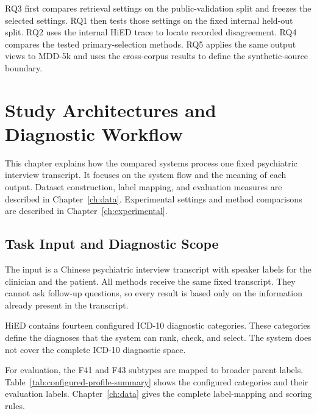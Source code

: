 \documentclass[12pt,a4paper,oneside]{report}
\begin{document}
RQ3 first compares retrieval settings on the public-validation split and freezes the selected settings. RQ1 then tests those settings on the fixed internal held-out split. RQ2 uses the internal HiED trace to locate recorded disagreement. RQ4 compares the tested primary-selection methods. RQ5 applies the same output views to MDD-5k and uses the cross-corpus results to define the synthetic-source boundary.

\chapter{Study Architectures and Diagnostic Workflow}
\label{ch:architecture}

This chapter explains how the compared systems process one fixed
psychiatric interview transcript. It focuses on the system flow and the
meaning of each output. Dataset construction, label mapping, and
evaluation measures are described in Chapter~\ref{ch:data}. Experimental
settings and method comparisons are described in
Chapter~\ref{ch:experimental}.

\section{Task Input and Diagnostic Scope}
\label{sec:input-diagnostic-scope}

The input is a Chinese psychiatric interview transcript with speaker
labels for the clinician and the patient. All methods receive the same
fixed transcript. They cannot ask follow-up questions, so every result is
based only on the information already present in the transcript.

HiED contains fourteen configured ICD-10 diagnostic categories. These
categories define the diagnoses that the system can rank, check, and
select. The system does not cover the complete ICD-10 diagnostic space.

For evaluation, the F41 and F43 subtypes are mapped to broader parent
labels. Table~\ref{tab:configured-profile-summary} shows the configured
categories and their evaluation labels. Chapter~\ref{ch:data} gives the
complete label-mapping and scoring rules.
\end{document}
